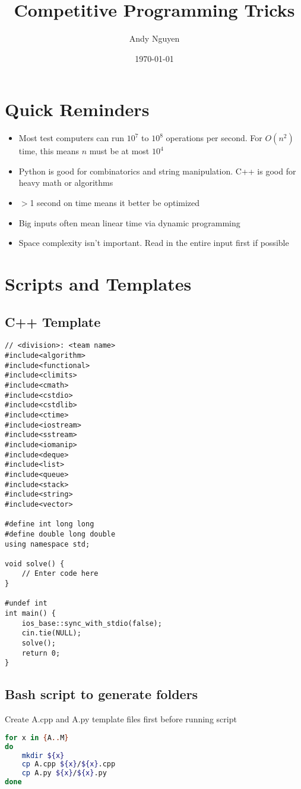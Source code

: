\documentclass{article}
\title{Competitive Programming Tricks}
\author{Andy Nguyen}
\date{\today}
\begin{document}
\maketitle
\section{Quick Reminders}
\begin{itemize}
    \item Most test computers can run $10^7$ to $10^8$ operations per second. For $O(n^2)$ time, this means $n$ must be at most $10^4$
    \item Python is good for combinatorics and string manipulation. C++ is good for heavy math or algorithms
    \item $>$1 second on time means it better be optimized
    \item Big inputs often mean linear time via dynamic programming
    \item Space complexity isn't important. Read in the entire input first if possible
\end{itemize}
\newpage
\tableofcontents
\newpage
\section{Scripts and Templates}
\subsection{C++ Template}
\begin{lstlisting}
// <division>: <team name>
#include<algorithm>
#include<functional>
#include<climits>
#include<cmath>
#include<cstdio>
#include<cstdlib>
#include<ctime>
#include<iostream>
#include<sstream>
#include<iomanip>
#include<deque>
#include<list>
#include<queue>
#include<stack>
#include<string>
#include<vector>

#define int long long
#define double long double
using namespace std;

void solve() {
    // Enter code here
}

#undef int
int main() {
    ios_base::sync_with_stdio(false);
    cin.tie(NULL);
    solve();
    return 0;
}
\end{lstlisting}
\subsection{Bash script to generate folders}
Create A.cpp and A.py template files first before running script
\begin{lstlisting}[language=Bash]
for x in {A..M}
do
    mkdir ${x}
    cp A.cpp ${x}/${x}.cpp
    cp A.py ${x}/${x}.py
done
\end{lstlisting}
\end{document}
